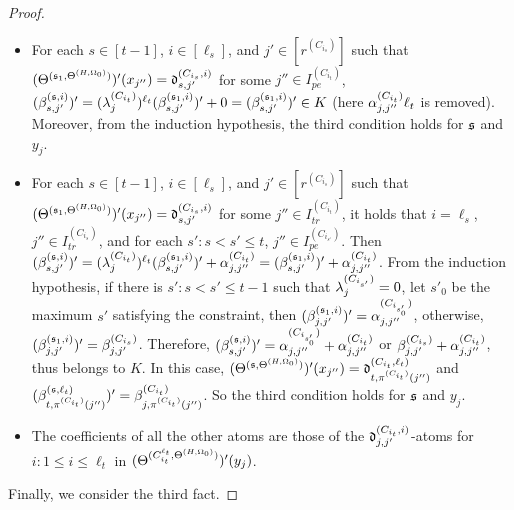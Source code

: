 \begin{appendix}
\begin{proof}
\begin{itemize}
%
\item For each $s \in [t-1]$, $i \in [\ell_s]$, and $j' \in [r^{(C_{i_s})}]$ such that $(\Theta^{({\mathfrak{s} }_1,\Theta^{(H,\Omega_0)})})'(x_{j''}) = \mathfrak{d}^{(C_{i_s}, i)}_{s, j'}$ for some $j'' \in I^{(C_{i_t})}_{pe}$, $(\beta^{({\mathfrak{s} },i)}_{s,j'})' =(\lambda^{(C_{i_t})}_{j})^{\ell_t}  (\beta^{({\mathfrak{s} }_1, i)}_{s, j'})'+ 0  =  (\beta^{({\mathfrak{s} }_1, i)}_{s, j'})' \in K$ (here $\alpha^{(C_{i_t})}_{j, j''} \ell_t$ is removed). Moreover, from the induction hypothesis, the third condition holds for ${\mathfrak{s} }$ and $y_j$.
%
\item For each $s \in [t-1]$, $i \in [\ell_s]$, and $j' \in [r^{(C_{i_s})}]$ such that $(\Theta^{({\mathfrak{s} }_1,\Theta^{(H,\Omega_0)})})'(x_{j''}) = \mathfrak{d}^{(C_{i_s}, i)}_{s, j'}$ for some $j'' \in I^{(C_{i_t})}_{tr}$, it holds that $i = \ell_s$, $j'' \in I^{(C_{i_s})}_{tr}$, and for each $s': s < s' \le t$, $j'' \in I^{(C_{i_{s'}})}_{pe}$. Then $(\beta^{({\mathfrak{s} },i)}_{s,j'})' =(\lambda^{(C_{i_t})}_{j})^{\ell_t}  (\beta^{({\mathfrak{s} }_1, i)}_{s, j'})' + \alpha^{(C_{i_t})}_{j, j''}  =  (\beta^{({\mathfrak{s} }_1, i)}_{s, j'})' + \alpha^{(C_{i_t})}_{j, j''}$. From the induction hypothesis,  if there is $s': s < s' \le t-1$ such that $\lambda^{(C_{i_{s'}})}_j =0$, let $s'_0$ be the maximum $s'$ satisfying the constraint, then $(\beta^{({\mathfrak{s} }_1, i)}_{j,j'})'=\alpha^{(C_{i_{s'_0}})}_{j, j''}$, otherwise, $(\beta^{({\mathfrak{s} }_1, i)}_{j,j'})'= \beta^{(C_{i_s})}_{j,j'}$. Therefore, $(\beta^{({\mathfrak{s} },i)}_{s,j'})' = \alpha^{(C_{i_{s'_0}})}_{j, j''} + \alpha^{(C_{i_t})}_{j, j''}$ or $\beta^{(C_{i_s})}_{j,j'} + \alpha^{(C_{i_t})}_{j, j''}$, thus belongs to $K$. In this case, $(\Theta^{({\mathfrak{s} },\Theta^{(H,\Omega_0)})})'(x_{j''})=\mathfrak{d}^{(C_{i_t},\ell_t)}_{t, \pi^{(C_{i_t})}(j'')}$ and $(\beta^{({\mathfrak{s} },\ell_t)}_{t, \pi^{(C_{i_t})}(j'')})' = \beta^{(C_{i_t})}_{j, \pi^{(C_{i_t})}(j'')}$. So the third condition holds for ${\mathfrak{s} }$ and $y_j$.
%
\item The coefficients of all the other atoms are those of  the $\mathfrak{d}^{(C_{i_t}, i)}_{j, j'}$-atoms for $i: 1 \le i \le \ell_t$ in $(\Theta^{(C^{\ell_t}_{i_t},\Theta^{(H,\Omega_0)})})'(y_j)$.
\end{itemize} 

\smallskip

Finally, we consider the third fact.


\end{proof}
\end{appendix}
